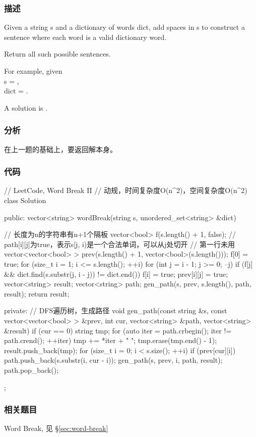 \subsubsection{描述}
Given a string s and a dictionary of words dict, add spaces in s to construct a sentence where each word is a valid dictionary word.

Return all such possible sentences.

For example, given  \\
s = , \\
dict = .

A solution is .


\subsubsection{分析}
在上一题的基础上，要返回解本身。


\subsubsection{代码}
\begin{Code}
// LeetCode, Word Break II
// 动规，时间复杂度O(n^2)，空间复杂度O(n^2)
class Solution {
public:
    vector<string> wordBreak(string s, unordered_set<string> &dict) {
        // 长度为n的字符串有n+1个隔板
        vector<bool> f(s.length() + 1, false);
        // path[i][j]为true，表示s[j, i)是一个合法单词，可以从j处切开
        // 第一行未用
        vector<vector<bool> > prev(s.length() + 1, vector<bool>(s.length()));
        f[0] = true;
        for (size_t i = 1; i <= s.length(); ++i) {
            for (int j = i - 1; j >= 0; --j) {
                if (f[j] && dict.find(s.substr(j, i - j)) != dict.end()) {
                    f[i] = true;
                    prev[i][j] = true;
                }
            }
        }
        vector<string> result;
        vector<string> path;
        gen_path(s, prev, s.length(), path, result);
        return result;

    }
private:
    // DFS遍历树，生成路径
    void gen_path(const string &s, const vector<vector<bool> > &prev,
            int cur, vector<string> &path, vector<string> &result) {
        if (cur == 0) {
            string tmp;
            for (auto iter = path.crbegin(); iter != path.crend(); ++iter)
                tmp += *iter + " ";
            tmp.erase(tmp.end() - 1);
            result.push_back(tmp);
        }
        for (size_t i = 0; i < s.size(); ++i) {
            if (prev[cur][i]) {
                path.push_back(s.substr(i, cur - i));
                gen_path(s, prev, i, path, result);
                path.pop_back();
            }
        }
    }
};
\end{Code}


\subsubsection{相关题目}
\begindot
\item Word Break, 见 \S \ref{sec:word-break}
\myenddot

